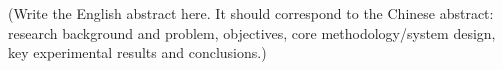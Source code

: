 
\begin{abstracten}

(Write the English abstract here. It should correspond to the Chinese abstract: research background and problem, objectives, core methodology/system design, key experimental results and conclusions.)

\end{abstracten}
